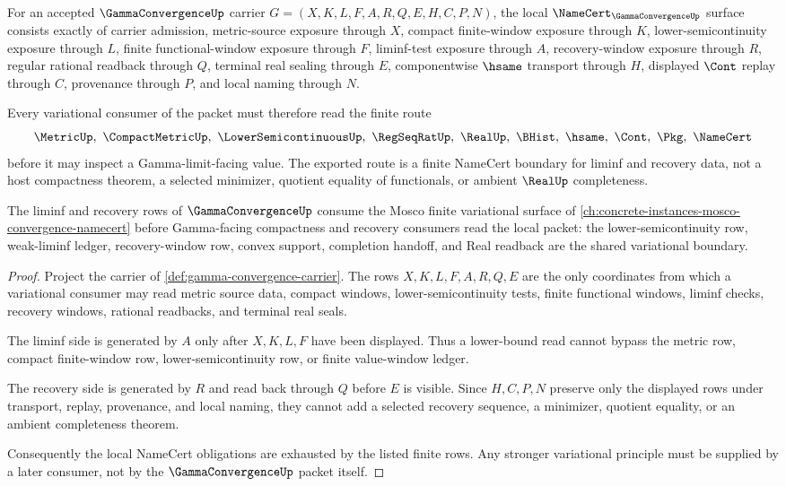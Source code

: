 \begin{theorem}
\label{thm:gamma-convergence-namecert-obligations}
For an accepted $\GammaConvergenceUp$ carrier $G=(X,K,L,F,A,R,Q,E,H,C,P,N)$, the local $\NameCert_{\GammaConvergenceUp}$ surface consists exactly of carrier admission, metric-source exposure through $X$, compact finite-window exposure through $K$, lower-semicontinuity exposure through $L$, finite functional-window exposure through $F$, liminf-test exposure through $A$, recovery-window exposure through $R$, regular rational readback through $Q$, terminal real sealing through $E$, componentwise $\hsame$ transport through $H$, displayed $\Cont$ replay through $C$, provenance through $P$, and local naming through $N$.

Every variational consumer of the packet must therefore read the finite route
$$
\MetricUp,\ \CompactMetricUp,\ \LowerSemicontinuousUp,\ \RegSeqRatUp,\ \RealUp,\ \BHist,\ \hsame,\ \Cont,\ \Pkg,\ \NameCert
$$
before it may inspect a Gamma-limit-facing value. The exported route is a finite NameCert boundary for liminf and recovery data, not a host compactness theorem, a selected minimizer, quotient equality of functionals, or ambient $\RealUp$ completeness.
\end{theorem}

The liminf and recovery rows of $\GammaConvergenceUp$ consume the Mosco finite variational surface of \autoref{ch:concrete-instances-mosco-convergence-namecert} before Gamma-facing compactness and recovery consumers read the local packet: the lower-semicontinuity row, weak-liminf ledger, recovery-window row, convex support, completion handoff, and Real readback are the shared variational boundary.

\begin{proof}
Project the carrier of \autoref{def:gamma-convergence-carrier}. The rows $X,K,L,F,A,R,Q,E$ are the only coordinates from which a variational consumer may read metric source data, compact windows, lower-semicontinuity tests, finite functional windows, liminf checks, recovery windows, rational readbacks, and terminal real seals.

The liminf side is generated by $A$ only after $X,K,L,F$ have been displayed. Thus a lower-bound read cannot bypass the metric row, compact finite-window row, lower-semicontinuity row, or finite value-window ledger.

The recovery side is generated by $R$ and read back through $Q$ before $E$ is visible. Since $H,C,P,N$ preserve only the displayed rows under transport, replay, provenance, and local naming, they cannot add a selected recovery sequence, a minimizer, quotient equality, or an ambient completeness theorem.

Consequently the local NameCert obligations are exhausted by the listed finite rows. Any stronger variational principle must be supplied by a later consumer, not by the $\GammaConvergenceUp$ packet itself.
\end{proof}

